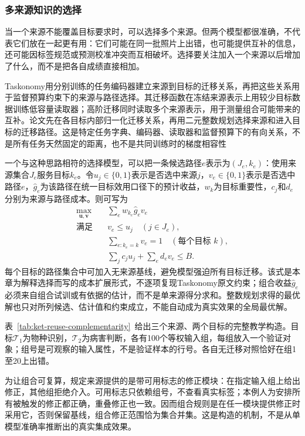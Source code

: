 \subsubsection{多来源知识的选择}
\label{sec:ket-reuse-multiple-sources}

当一个来源不能覆盖目标要求时，可以选择多个来源。但两个模型都很准确，不代表它们放在一起更有用：它们可能在同一批照片上出错，也可能提供互补的信息，还可能因标签规范或预测校准冲突而互相破坏。选择要关注加入一个来源以后增加了什么，而不是把各自成绩直接相加。

Taskonomy用分别训练的任务编码器建立来源到目标的迁移关系，再把这些关系用于监督预算约束下的来源与路径选择。其迁移函数在冻结来源表示上用较少目标数据训练低容量读取器；高阶迁移同时读取多个来源表示，用于测量组合可能带来的互补。论文先在各目标内部归一化迁移关系，再用二元整数规划选择来源和进入目标的迁移路径。这是特定任务字典、编码器、读取器和监督预算下的有向关系，不是所有任务天然固定的距离，也不是共同训练时的梯度相容性

一个与这种思路相符的选择模型，可以把一条候选路径$e$表示为$(J_e,k_e)$：使用来源集合$J_e$服务目标$k_e$。令$u_j\in\{0,1\}$表示是否选中来源$j$，$v_e\in\{0,1\}$表示是否选中路径$e$，$\hat g_e$为该路径在统一目标效用口径下的预计收益，$w_k$为目标重要性，$c_j$和$d_e$分别为来源与路径成本。则可写为
\begin{equation}
  \begin{aligned}
    \max_{\bm u,\bm v}\quad
      &\sum_e w_{k_e}\hat g_ev_e\\
    \text{满足}\quad
      &v_e\leq u_j \quad(j\in J_e),\\
      &\sum_{e:k_e=k}v_e=1 \quad(\text{每个目标 }k),\\
      &\sum_jc_ju_j+\sum_ed_ev_e\leq B.
  \end{aligned}
  \label{eq:ket-reuse-path-choice}
\end{equation}
每个目标的路径集合中可加入无来源基线，避免模型强迫所有目标迁移。该式是本章为解释选择而写的成本扩展形式，不逐项复现Taskonomy原文约束；组合收益$\hat g_e$必须来自组合试训或有依据的估计，而不是单来源得分求和。整数规划求得的最优解也只对所列候选、估计值和约束成立，不能自动成为真实效果的全局最优解。

表~\ref{tab:ket-reuse-complementarity}~给出三个来源、两个目标的完整教学构造。目标$\mathcal T_1$为物种识别，$\mathcal T_2$为病害判断，各有100个等权输入组，每组放入一个验证对象；组号是可观察的输入属性，不是验证样本的行号。各自无迁移对照恰好在组1至20上出错。

为让组合可复算，规定来源提供的是带可用标志的修正模块：在指定输入组上给出修正，其他组拒绝介入。可用标志只依赖组号，不查看真实标签；本例人为安排所有被触发的修正都正确，重叠修正也一致。因而组合规则是在任一模块提供修正时采用它，否则保留基线，组合修正范围恰为集合并集。这是构造的机制，不是从单模型准确率推断出的真实集成效果。

